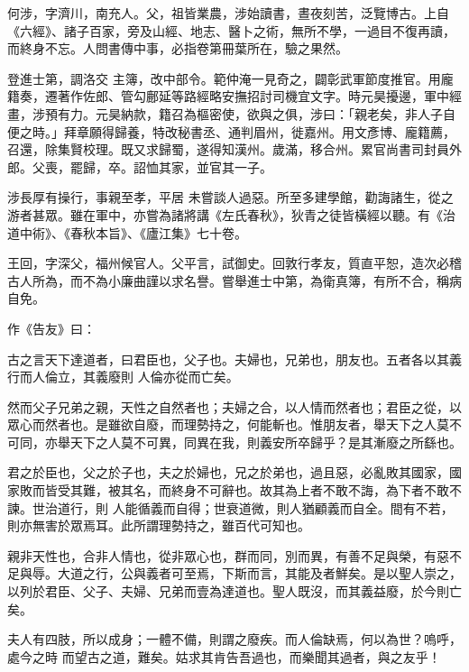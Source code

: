 \begin{pinyinscope}
 何涉，字濟川，南充人。父，祖皆業農，涉始讀書，晝夜刻苦，泛覽博古。上自《六經》、諸子百家，旁及山經、地志、醫卜之術，無所不學，一過目不復再讀，而終身不忘。人問書傳中事，必指卷第冊葉所在，驗之果然。



 登進士第，調洛交
 主簿，改中部令。範仲淹一見奇之，闢彰武軍節度推官。用龐籍奏，遷著作佐郎、管勾鄜延等路經略安撫招討司機宜文字。時元昊擾邊，軍中經畫，涉預有力。元昊納款，籍召為樞密使，欲與之俱，涉曰：「親老矣，非人子自便之時。」拜章願得歸養，特改秘書丞、通判眉州，徙嘉州。用文彥博、龐籍薦，召還，除集賢校理。既又求歸蜀，遂得知漢州。歲滿，移合州。累官尚書司封員外郎。父喪，罷歸，卒。詔恤其家，並官其一子。



 涉長厚有操行，事親至孝，平居
 未嘗談人過惡。所至多建學館，勸誨諸生，從之游者甚眾。雖在軍中，亦嘗為諸將講《左氏春秋》，狄青之徒皆橫經以聽。有《治道中術》、《春秋本旨》、《廬江集》七十卷。



 王回，字深父，福州候官人。父平言，試御史。回敦行孝友，質直平恕，造次必稽古人所為，而不為小廉曲謹以求名譽。嘗舉進士中第，為衛真簿，有所不合，稱病自免。



 作《告友》曰：



 古之言天下達道者，曰君臣也，父子也。夫婦也，兄弟也，朋友也。五者各以其義行而人倫立，其義廢則
 人倫亦從而亡矣。



 然而父子兄弟之親，天性之自然者也；夫婦之合，以人情而然者也；君臣之從，以眾心而然者也。是雖欲自廢，而理勢持之，何能斬也。惟朋友者，舉天下之人莫不可同，亦舉天下之人莫不可異，同異在我，則義安所卒歸乎？是其漸廢之所繇也。



 君之於臣也，父之於子也，夫之於婦也，兄之於弟也，過且惡，必亂敗其國家，國家敗而皆受其難，被其名，而終身不可辭也。故其為上者不敢不誨，為下者不敢不諫。世治道行，則
 人能循義而自得；世衰道微，則人猶顧義而自全。間有不若，則亦無害於眾焉耳。此所謂理勢持之，雖百代可知也。



 親非天性也，合非人情也，從非眾心也，群而同，別而異，有善不足與榮，有惡不足與辱。大道之行，公與義者可至焉，下斯而言，其能及者鮮矣。是以聖人崇之，以列於君臣、父子、夫婦、兄弟而壹為達道也。聖人既沒，而其義益廢，於今則亡矣。



 夫人有四肢，所以成身；一體不備，則謂之廢疾。而人倫缺焉，何以為世？嗚呼，處今之時
 而望古之道，難矣。姑求其肯告吾過也，而樂聞其過者，與之友乎！




\end{pinyinscope}
